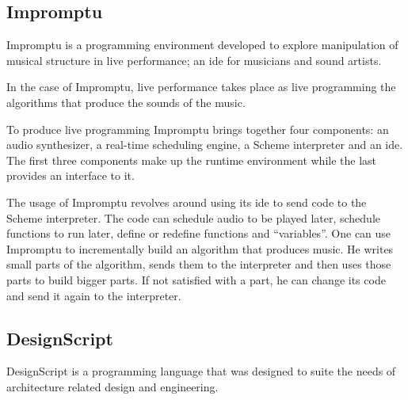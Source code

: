 \documentclass{./llncs2e/llncs}
\begin{document}
\subsection{Impromptu\cite{sorensen2005impromptu}\cite{sorensen2010programming}}
	Impromptu is a programming environment developed to explore manipulation of musical structure in live performance; an \ac{ide} for musicians and sound artists.

	In the case of Impromptu, live performance takes place as live programming the algorithms that produce the sounds of the music.

	To produce live programming Impromptu brings together four components: an audio synthesizer, a real-time scheduling engine, a Scheme interpreter and an \ac{ide}. 
	The first three components make up the runtime environment while the last provides an interface to it. 

	The usage of Impromptu revolves around using its \ac{ide} to send code to the Scheme interpreter. 
	The code can schedule audio to be played later, schedule functions to run later, define or redefine functions and ``variables''. 
	One can use Impromptu to incrementally build an algorithm that produces music. 
	He writes small parts of the algorithm, sends them to the interpreter and then uses those parts to build bigger parts. 
	If not satisfied with a part, he can change its code and send it again to the interpreter.


\subsection{DesignScript\cite{aish2012designscript}}
	DesignScript is a programming language that was designed to suite the needs of architecture related design and engineering.
\end{document}
